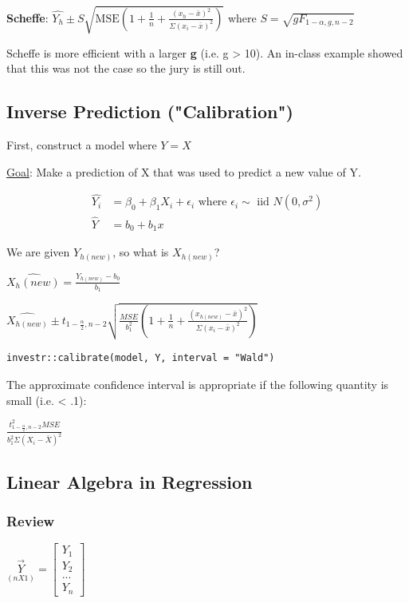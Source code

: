 \documentclass[11pt]{article}
\begin{document}
\textbf{Scheffe}: \(\hat{Y_h} \pm S \sqrt{\text{MSE}(1 + \frac{1}{n} +\frac{(x_h -
 \bar{x})^2}{\Sigma(x_i - \bar{x})^2})}\) where \(S = \sqrt{g F_{1 - \alpha,g,n-2}}\)

Scheffe is more efficient with a larger \textbf{g} (i.e. g > 10). An in-class example
showed that this was not the case so the jury is still out.
\subsection{Inverse Prediction ("Calibration")}
\label{sec:org7e4d456}

First, construct a model where \(Y = X\)

\uline{Goal}: Make a prediction of X that was used to predict a new value of Y.

\begin{equation}
\begin{split}
\hat{Y_i} & = \beta_0 + \beta_1 X_i + \epsilon_i \text{ where } \epsilon_i \sim \text{ iid } N(0, \sigma^2)\\
\hat{Y} & = b_0 + b_1 x
\end{split}
\end{equation}

We are given \(Y_{h(new)}\), so what is \(X_{h(new)}\)?

\(\hat{X_h(new)} = \frac{Y_{h(new)} - b_0}{b_1}\)

\(\hat{X_{h(new)}} \pm t_{1 - \frac{\alpha}{2},n-2} \sqrt{\frac{MSE}{b_1^2} (1 + \frac{1}{n} +\frac{(x_{h(new)} - \bar{x})^2}{\Sigma(x_i - \bar{x})^2})}\)

\begin{verbatim}
investr::calibrate(model, Y, interval = "Wald")
\end{verbatim}

The approximate confidence interval is appropriate if the following quantity is
small (i.e. < .1):

\(\frac{t_{1 - \frac{\alpha}{2}, n - 2}^2 MSE}{b_1^2 \Sigma (X_i - \bar{X})^2}\)

\subsection{Linear Algebra in Regression}
\label{sec:orge1cbf0d}
\subsubsection{Review}
\label{sec:org7f3734d}

\(\underset{(n X 1)}{\vec{Y}} =
\begin{bmatrix}
Y_1\\
Y_2\\
...\\
Y_n
\end{bmatrix}\)
\end{document}
